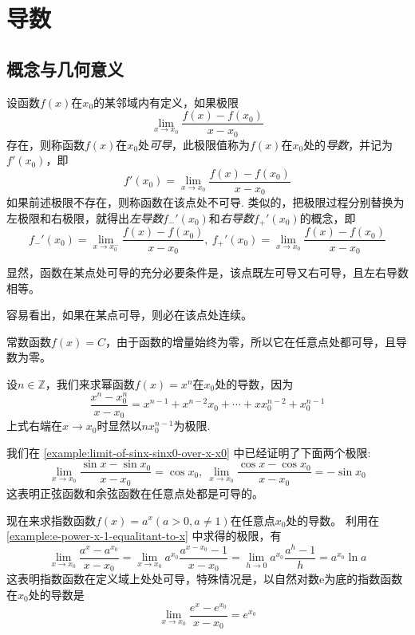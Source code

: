 
\section{导数}
\label{sec:derivative}

\subsection{概念与几何意义}
\label{sec:concept-of-derivative}

\begin{definition}
  设函数$f(x)$在$x_0$的某邻域内有定义，如果极限
  \[ \lim_{x \to x_0} \frac{f(x)-f(x_0)}{x-x_0} \]
  存在，则称函数$f(x)$在$x_0$处\emph{可导}，此极限值称为$f(x)$在$x_0$处的\emph{导数}，并记为$f'(x_0)$，即
  \[ f'(x_0) = \lim_{x \to x_0} \frac{f(x)-f(x_0)}{x-x_0} \]
  如果前述极限不存在，则称函数在该点处不可导. 类似的，把极限过程分别替换为左极限和右极限，就得出\emph{左导数}$f_-'(x_0)$和\emph{右导数}$f_+'(x_0)$的概念，即
  \[ f_-'(x_0) = \lim_{x \to x_0^-} \frac{f(x)-f(x_0)}{x-x_0}, \ f_+'(x_0) = \lim_{x \to x_0} \frac{f(x)-f(x_0)}{x-x_0} \]
\end{definition}

显然，函数在某点处可导的充分必要条件是，该点既左可导又右可导，且左右导数相等。

容易看出，如果在某点可导，则必在该点处连续。

\begin{example}
  常数函数$f(x)=C$，由于函数的增量始终为零，所以它在任意点处都可导，且导数为零。
\end{example}

\begin{example}
  设$n \in \mathbb{Z}$，我们来求幂函数$f(x)=x^n$在$x_0$处的导数，因为
  \[ \frac{x^n-x_0^n}{x-x_0} = x^{n-1}+x^{n-2}x_0+\cdots+xx_0^{n-2}+x_0^{n-1} \]
  上式右端在$x \to x_0$时显然以$nx_0^{n-1}$为极限.
\end{example}

\begin{example}
 我们在 \autoref{example:limit-of-sinx-sinx0-over-x-x0} 中已经证明了下面两个极限:
  \[ \lim_{x \to x_0} \frac{\sin{x}-\sin{x_0}}{x-x_0} = \cos{x_0}, \  
   \lim_{x \to x_0} \frac{\cos{x}-\cos{x_0}}{x-x_0} = -\sin{x_0} \]
 这表明正弦函数和余弦函数在任意点处都是可导的。
\end{example}

\begin{example}
  现在来求指数函数$f(x)=a^x(a>0,a\neq 1)$在任意点$x_0$处的导数。
  利用在 \autoref{example:e-power-x-1-equalitant-to-x} 中求得的极限，有
  \[ \lim_{x \to x_0} \frac{a^{x}-a^{x_0}}{x-x_0} = \lim_{x \to x_0} a^{x_0} \frac{a^{x-x_0}-1}{x-x_0} = \lim_{h \to 0} a^{x_0} \frac{a^h-1}{h} = a^{x_0} \ln{a} \]
  这表明指数函数在定义域上处处可导，特殊情况是，以自然对数$\mathrm{e}$为底的指数函数在$x_0$处的导数是
  \[ \lim_{x \to x_0} \frac{e^x-e^{x_0}}{x-x_0} = e^{x_0} \]
\end{example}


